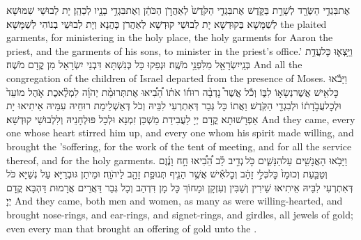 {אֶת\maqqaf בִּגְדֵ֥י הַשְּׂרָ֖ד לְשָׁרֵ֣ת בַּקֹּ֑דֶשׁ אֶת\maqqaf בִּגְדֵ֤י הַקֹּ֙דֶשׁ֙ לְאַהֲרֹ֣ן הַכֹּהֵ֔ן וְאֶת\maqqaf בִּגְדֵ֥י בָנָ֖יו לְכַהֵֽן׃}
{יָת לְבוּשֵׁי שִׁמּוּשָׁא לְשַׁמָּשָׁא בְּקוּדְשָׁא יָת לְבוּשֵׁי קוּדְשָׁא לְאַהֲרֹן כָּהֲנָא וְיָת לְבוּשֵׁי בְנוֹהִי לְשַׁמָּשָׁא׃}
{the plaited garments, for ministering in the holy place, the holy garments for Aaron the priest, and the garments of his sons, to minister in the priest’s office.’}{}
{וַיֵּ֥צְא֛וּ כׇּל\maqqaf עֲדַ֥ת בְּנֵֽי\maqqaf יִשְׂרָאֵ֖ל מִלִּפְנֵ֥י מֹשֶֽׁה׃}
{וּנְפַקוּ כָּל כְּנִשְׁתָּא דִּבְנֵי יִשְׂרָאֵל מִן קֳדָם מֹשֶׁה׃}
{And all the congregation of the children of Israel departed from the presence of Moses.}{}
{וַיָּבֹ֕אוּ כׇּל\maqqaf אִ֖ישׁ אֲשֶׁר\maqqaf נְשָׂא֣וֹ לִבּ֑וֹ וְכֹ֡ל אֲשֶׁר֩ נָדְבָ֨ה רוּח֜וֹ אֹת֗וֹ הֵ֠בִ֠יאוּ אֶת\maqqaf תְּרוּמַ֨ת יְהֹוָ֜ה לִמְלֶ֨אכֶת אֹ֤הֶל מוֹעֵד֙ וּלְכׇל\maqqaf עֲבֹ֣דָת֔וֹ וּלְבִגְדֵ֖י הַקֹּֽדֶשׁ׃}
{וַאֲתוֹ כָּל גְּבַר דְּאִתְרְעִי לִבֵּיהּ וְכֹל דְּאַשְׁלֵימַת רוּחֵיהּ עִמֵּיהּ אֵיתִיאוּ יָת אַפְרָשׁוּתָא קֳדָם יְיָ לַעֲבִידַת מַשְׁכַּן זִמְנָא וּלְכָל פּוּלְחָנֵיהּ וְלִלְבוּשֵׁי קוּדְשָׁא׃}
{And they came, every one whose heart stirred him up, and every one whom his spirit made willing, and brought the \lord\textsc{’s}\space offering, for the work of the tent of meeting, and for all the service thereof, and for the holy garments.}{}
{וַיָּבֹ֥אוּ הָאֲנָשִׁ֖ים עַל\maqqaf הַנָּשִׁ֑ים כֹּ֣ל \legarmeh  נְדִ֣יב לֵ֗ב הֵ֠בִ֠יאוּ חָ֣ח וָנֶ֜זֶם וְטַבַּ֤עַת וְכוּמָז֙ כׇּל\maqqaf כְּלִ֣י זָהָ֔ב וְכׇל\maqqaf אִ֕ישׁ אֲשֶׁ֥ר הֵנִ֛יף תְּנוּפַ֥ת זָהָ֖ב לַיהֹוָֽה׃}
{וּמֵיתַן גּוּבְרַיָּא עַל נְשַׁיָּא כֹּל דְּאִתְרְעִי לִבֵּיהּ אֵיתִיאוּ שֵׁירִין וְשַׁבִּין וְעִזְקָן וּמָחוֹךְ כָּל מָן דִּדְהַב וְכָל גְּבַר דַּאֲרֵים אֲרָמוּת דַּהְבָּא קֳדָם יְיָ׃}
{And they came, both men and women, as many as were willing-hearted, and brought nose-rings, and ear-rings, and signet-rings, and girdles, all jewels of gold; even every man that brought an offering of gold unto the \lord.}{}

